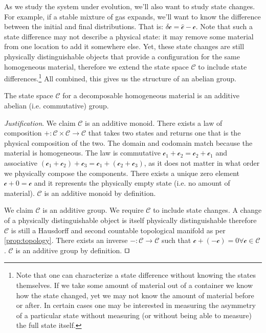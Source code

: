 \documentclass[smallextended]{svjour3}
\numberwithin{equation}{section}
\newenvironment{justification}{\emph{Justification}.}{\hfill\(\qed\)}
\begin{document}
As we study the system under evolution, we'll also want to study state changes. For example, if a stable mixture of gas expands, we'll want to know the difference between the initial and final distributions. That is: $\delta\mathcal{c}=\hat{\mathcal{c}}-\mathcal{c}$. Note that such a state difference may not describe a physical state: it may remove some material from one location to add it somewhere else. Yet, these state changes are still physically distinguishable objects that provide a configuration for the same homogeneous material, therefore we extend the state space $\mathcal{C}$ to include state differences.\footnote{Note that one can characterize a state difference without knowing the states themselves. If we take some amount of material out of a container we know how the state changed, yet we may not know the amount of material before or after. In certain cases one may be interested in measuring the asymmetry of a particular state without measuring (or without being able to measure) the full state itself.} All combined, this gives us the structure of an abelian group.

\begin{prop}\label{prop:abelian_group}
The state space $\mathcal{C}$ for a decomposable homogeneous material is an additive abelian (i.e. commutative) group.
\end{prop}

\begin{justification}
We claim $\mathcal{C}$ is an additive monoid. There exists a law of composition $+ : \mathcal{C} \times \mathcal{C} \rightarrow \mathcal{C}$ that takes two states and returns one that is the physical composition of the two. The domain and codomain match because the material is homogeneous. The law is commutative $\mathcal{c}_1 +\mathcal{c}_2 = \mathcal{c}_2+\mathcal{c}_1$ and associative $(\mathcal{c}_1 + \mathcal{c}_2) + \mathcal{c}_3 = \mathcal{c}_1 + (\mathcal{c}_2 + \mathcal{c}_3)$, as it does not matter in what order we physically compose the components. There exists a unique zero element $\mathcal{c} + 0 = \mathcal{c}$ and it represents the physically empty state (i.e. no amount of material). $\mathcal{C}$ is an additive monoid by definition.

We claim $\mathcal{C}$ is an additive group. We require $\mathcal{C}$ to include state changes. A change of a physically distinguishable object is itself physically distinguishable therefore $\mathcal{C}$ is still a Hausdorff and second countable topological manifold as per \ref{prop:topology}. There exists an inverse $- : \mathcal{C} \rightarrow \mathcal{C}$ such that $\mathcal{c} + ( - \mathcal{c}) = 0 \forall \mathcal{c} \in \mathcal{C}$. $\mathcal{C}$ is an additive group by definition. 
\end{justification}
\end{document}
